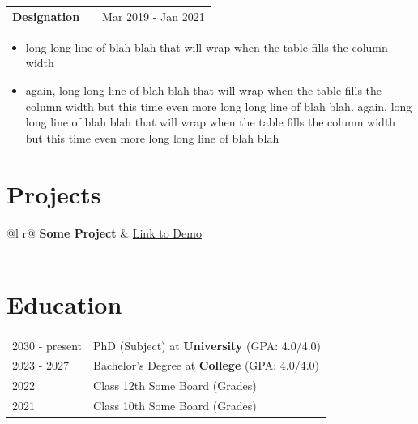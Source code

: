 \documentclass[a4paper,12pt]{article}
\makeatletter
\newenvironment{joblong}[2]
    {
    \begin{tabularx}{\linewidth}{@{}l X r@{}}
    \textbf{#1} & \hfill &  #2 \\[3.75pt]
    \end{tabularx}
    \begin{minipage}[t]{\linewidth}
    \begin{itemize}[nosep,after=\strut, leftmargin=1em, itemsep=3pt,label=--]
    }
    {
    \end{itemize}
    \end{minipage}    
    }
\makeatother
\begin{document}
\begin{joblong}{Designation}{Mar 2019 - Jan 2021}
\item long long line of blah blah that will wrap when the table fills the column width
\item again, long long line of blah blah that will wrap when the table fills the column width but this time even more long long line of blah blah. again, long long line of blah blah that will wrap when the table fills the column width but this time even more long long line of blah blah
\end{joblong}
  
\section{Projects}

\begin{tabularx}{\linewidth}{ @{}l r@{} }
\textbf{Some Project} & \hfill \href{https://some-link.com}{Link to Demo} \\[3.75pt]
  \\
\end{tabularx}

\section{Education}
\begin{tabularx}{\linewidth}{@{}l X@{}}	
2030 - present & PhD (Subject) at \textbf{University} \hfill \normalsize (GPA: 4.0/4.0) \\

2023 - 2027 & Bachelor's Degree at \textbf{College} \hfill (GPA: 4.0/4.0) \\ 

2022 & Class 12th Some Board \hfill  (Grades) \\

2021 & Class 10th Some Board \hfill  (Grades) \\
\end{tabularx}
\end{document}
